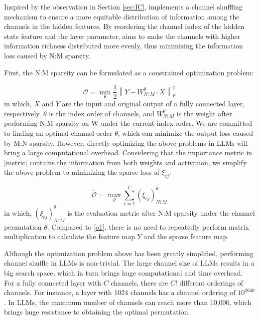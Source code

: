 Inspired by the observation in Section \ref{sec:IC}, \name implements a channel shuffling mechanism to ensure a more equitable distribution of information among the channels in the hidden features.
By reordering the channel index of the hidden state feature and the layer parameter, \name aims to make the channels with higher information richness distributed more evenly, thus minimizing the information loss caused by N:M sparsity. 

First, the N:M sparsity can be formulated as a constrained optimization problem:

\begin{equation}
\mathcal{O}=\mathop{\min}_{\theta} \frac{1}{2}\left\| Y - W_{N:M}^{\theta }\cdot X \right\|_{F}^{2}
\label{o1}
\end{equation}
in which, $X$ and $Y$ are the input and original output of a fully connected layer, respectively. $\theta$ is the index order of channels, and $W_{N:M}^{\theta }$ is the weight after performing N:M sparsity on W under the current index order. We are committed to finding an optimal channel order $\theta$, which can minimize the output loss caused by M:N sparsity. However, directly optimizing the above problems in LLMs will bring a large computational overhead. Considering that the importance metric in \eqref{metric} contains the information from both weights and activation, we simplify the above problem to minimizing the sparse loss of $\xi_{cj}$:

\begin{equation}
\mathcal{\acute{O}}=\mathop{\max}_{\theta}\sum_{c=1}^{C}(\xi_{cj})_{N:M}^{\theta }
\label{o2}
\end{equation}
in which, $(\xi_{cj})_{N:M}^{\theta }$ is the evaluation metric after N:M sparsity under the channel permutation $\theta$. Compared to \eqref{o1}, there is no need to repeatedly perform matrix multiplication to calculate the feature map $Y$ and the sparse feature map. 

Although the optimization problem above has been greatly simplified, performing channel shuffle in LLMs is non-trivial. The large channel size of LLMs results in a big search space, which in turn brings huge computational and time overhead. For a fully connected layer with $C$ channels, there are $C!$ different orderings of channels. For instance, a layer with 1024 channels has a channel ordering of $10^{2640}$. 
In LLMs, the maximum number of channels can reach more than 10,000, which brings huge resistance to obtaining the optimal permutation.

